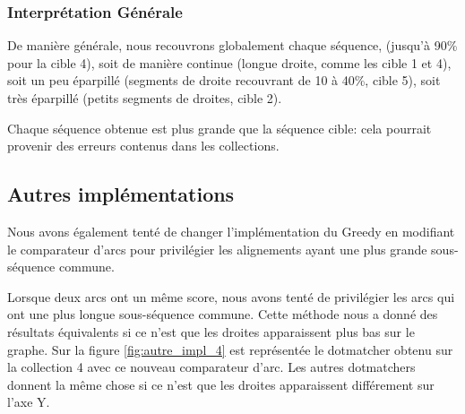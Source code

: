 \FloatBarrier


\subsubsection*{Interprétation Générale}

De manière générale, nous recouvrons globalement chaque séquence, (jusqu'à 90\%
pour la cible 4), soit de manière continue (longue droite, comme les cible 1 et
4), soit un peu éparpillé (segments de droite recouvrant de 10 à 40\%, cible 5),
soit très éparpillé (petits segments de droites, cible 2).

Chaque séquence obtenue est plus grande que la séquence cible: cela pourrait
provenir des erreurs contenus dans les collections.

\subsection{Autres implémentations}

Nous avons également tenté de changer l'implémentation du Greedy en modifiant
le comparateur d'arcs pour privilégier les alignements ayant une plus grande
sous-séquence commune.

Lorsque deux arcs ont un même score, nous avons tenté de
privilégier les arcs qui ont une plus longue sous-séquence commune. Cette méthode
nous a donné des résultats équivalents si ce n'est que les droites apparaissent
plus bas sur le graphe. Sur la figure \ref{fig:autre_impl_4} est représentée le
dotmatcher obtenu sur la collection 4 avec ce nouveau comparateur d'arc. Les
autres dotmatchers donnent la même chose si ce n'est que les droites
apparaissent différement sur l'axe Y.

